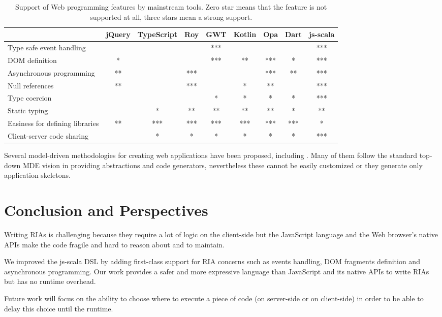 \documentclass[american,english,runningheads]{llncs}
\begin{document}
\begin{table}
\centering
\begin{tabular}{| l | c | c | c | c | c | c | c | c |}
\hline
& jQuery & TypeScript & Roy & GWT & Kotlin & Opa & Dart & js-scala \\
\hline
Type safe event handling & & & & *** & & & & *** \\
\hline
DOM definition & * & & & *** & ** & *** & * & *** \\
\hline
Asynchronous programming & ** & & *** & & & *** & ** & *** \\
\hline
Null references & ** & & *** & & * & ** & & *** \\
\hline
Type coercion & & & & * & * & * & * & *** \\
\hline
Static typing & & * & ** & ** & ** & ** & * & ** \\
\hline
Easiness for defining libraries & ** & *** & *** & *** & *** & *** & *** & * \\
\hline
Client-server code sharing & & * & * & * & * & *  & * & *** \\
\hline
\end{tabular}
\caption{Support of Web programming features by mainstream tools. Zero star means that the feature is not supported
at all, three stars mean a strong support.}
\label{comparison}
\end{table}

Several model-driven methodologies for creating web applications have been proposed, including
\cite{schwabe1996systematic,lima2003modeling,ceri2000web,koch2001authoring,pastor2003oows,valverde2007mda,vdovjak2003engineering,kraus2007model,nunes2006rapid,brambilla2008designing,valderas2007transformational,van2006hera,Groenewegen08_WebDSL}.
Many of them follow the standard top-down MDE vision in providing abstractions and code generators, nevertheless
these cannot be easily customized or they generate only application skeletons.

\section{Conclusion and Perspectives}
\label{discussion}

Writing RIAs is challenging because they require a lot of logic on the client-side but the JavaScript language and
the Web browser’s native APIs make the code fragile and hard to reason about and to maintain.

We improved the js-scala DSL by adding first-class support for RIA concerns such as events handling,
DOM fragments definition and asynchronous programming. Our work provides a safer and more expressive language than
JavaScript and its native APIs to write RIAs but has no runtime overhead.

Future work will focus on the ability to choose where to execute a piece of code (on server-side or on client-side)
in order to be able to delay this choice until the runtime.



\end{document}
